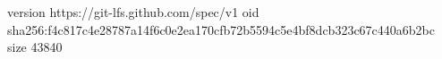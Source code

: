version https://git-lfs.github.com/spec/v1
oid sha256:f4c817c4e28787a14f6c0e2ea170cfb72b5594c5e4bf8dcb323c67c440a6b2bc
size 43840
